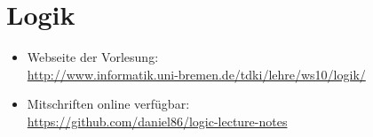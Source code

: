 \documentclass[10pt,a4paper]{article}
\begin{document}
\section*{Logik}

\begin{itemize}
  \item Webseite der Vorlesung:\\
  \url{http://www.informatik.uni-bremen.de/tdki/lehre/ws10/logik/}
  \item Mitschriften online verfügbar:\\
  \url{https://github.com/daniel86/logic-lecture-notes}
\end{itemize}













\end{document}
